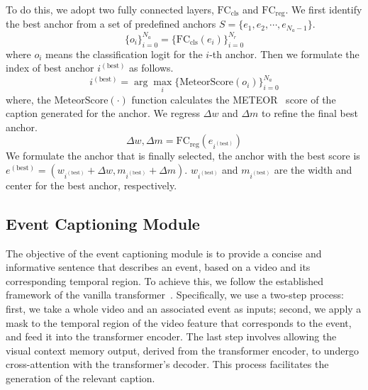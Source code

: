 To do this, we adopt two fully connected layers, $\text{FC}_{\text{cls}}$ and $\text{FC}_{\text{reg}}$.
We first identify the best anchor from a set of predefined anchors $S=\{e_1, e_2, \cdots, e_{N_a-1}\}$.
\begin{equation}
    \{o_i\}_{i=0}^{N_a} = \{ \text{FC}_{\text{cls}} \left( e_i \right) \}_{i=0}^{N_r}
\end{equation}
where $o_i$ means the classification logit for the $i$-th anchor.
Then we formulate the index of best anchor $i^{(\text{best})}$ as follows.
\begin{equation}
    i^{(\text{best})} = \arg \max_{i} \{\text{MeteorScore}(o_i)\}_{i=0}^{N_a}
\end{equation}
where, the $\text{MeteorScore}(\cdot)$ function calculates the METEOR~\cite{Banerjee2005-zo} score of the caption generated for the anchor.
We regress $\Delta w$ and $\Delta m$ to refine the final best anchor.
\begin{equation}
    \Delta w, \Delta m = \text{FC}_{\text{reg}} (e_{i^{(\text{best})}})
\end{equation}
We formulate the anchor that is finally selected, the anchor with the best score is $e^{(\text{best})}=(w_{i^{(\text{best})}}+\Delta w,m_{i^{(\text{best})}}+\Delta m)$.
$w_{i^{(\text{best})}}$ and $m_{i^{(\text{best})}}$ are the width and center for the best anchor, respectively.

\subsection{Event Captioning Module}
The objective of the event captioning module is to provide a concise and informative sentence that describes an event, based on a video and its corresponding temporal region.
To achieve this, we follow the established framework of the vanilla transformer~\cite{Vaswani2017-sc}.
Specifically, we use a two-step process: first, we take a whole video and an associated event as inputs; second, we apply a mask to the temporal region of the video feature that corresponds to the event, and feed it into the transformer encoder. The last step involves allowing the visual context memory output, derived from the transformer encoder, to undergo cross-attention with the transformer's decoder.
This process facilitates the generation of the relevant caption.

